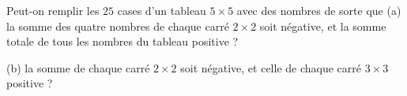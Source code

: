 Peut-on remplir les $25$ cases d'un tableau $5 \times 5$ avec des nombres de sorte que (a) la somme des quatre nombres de chaque carré $2 \times 2$ soit négative, et la somme totale de tous les nombres du tableau positive ?

(b) la somme de chaque carré $2 \times 2$ soit négative, et celle de chaque carré $3 \times 3$ positive ?
